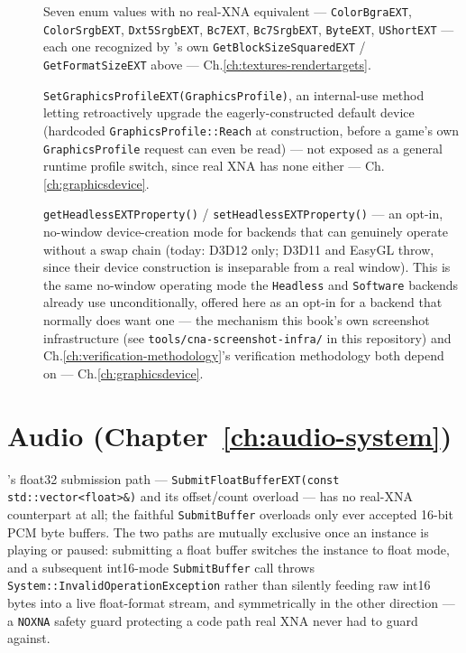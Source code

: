 \begin{description}
\item[] Seven enum values with no real-XNA equivalent ---
  \texttt{ColorBgraEXT}, \texttt{ColorSrgbEXT}, \texttt{Dxt5SrgbEXT}, \texttt{Bc7EXT},
  \texttt{Bc7SrgbEXT}, \texttt{ByteEXT}, \texttt{UShortEXT} --- each one recognized by
  's own \texttt{GetBlockSizeSquaredEXT} / \texttt{GetFormatSizeEXT} above ---
  Ch.\ref{ch:textures-rendertargets}.
\item[] \texttt{SetGraphicsProfileEXT(GraphicsProfile)}, an internal-use
  method letting  retroactively upgrade the eagerly-constructed
  default device (hardcoded \texttt{GraphicsProfile::Reach} at  construction,
  before a game's own \texttt{GraphicsProfile} request can even be read) --- not exposed as a
  general runtime profile switch, since real XNA has none either --- Ch.\ref{ch:graphicsdevice}.
\item[] \texttt{getHeadlessEXTProperty()} /
  \texttt{setHeadlessEXTProperty()} --- an opt-in, no-window device-creation mode for backends
  that can genuinely operate without a swap chain (today: D3D12 only; D3D11 and EasyGL throw,
  since their device construction is inseparable from a real window). This is the same
  no-window operating mode the \texttt{Headless} and \texttt{Software} backends already use
  unconditionally, offered here as an opt-in for a backend that normally does want one --- the
  mechanism this book's own screenshot infrastructure (see \texttt{tools/cna-screenshot-infra/}
  in this repository) and Ch.\ref{ch:verification-methodology}'s verification methodology both depend on --- Ch.\ref{ch:graphicsdevice}.
\end{description}

\section{Audio (Chapter~\ref{ch:audio-system})}

's float32 submission path ---
\texttt{SubmitFloatBufferEXT(const std::vector<float>\&)} and its offset/count overload --- has
no real-XNA counterpart at all; the faithful \texttt{SubmitBuffer} overloads only ever accepted
16-bit PCM byte buffers. The two paths are mutually exclusive once an instance is playing or
paused: submitting a float buffer switches the instance to float mode, and a subsequent
int16-mode \texttt{SubmitBuffer} call throws \texttt{System::InvalidOperationException} rather
than silently feeding raw int16 bytes into a live float-format stream, and symmetrically in the
other direction --- a \texttt{NOXNA} safety guard protecting a code path real XNA never had to
guard against.

